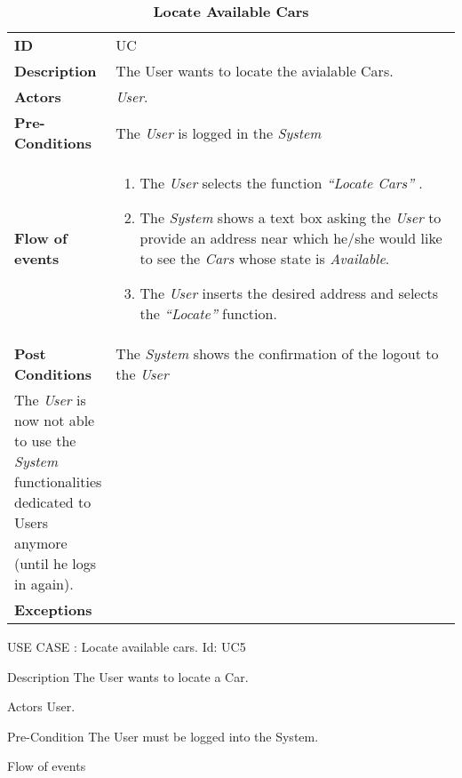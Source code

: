 \begin{longtable}{|p{0.2\linewidth} p{0.8\linewidth}|}
	\captionsetup{labelformat=empty} %
	\caption{\textbf{Locate Available Cars}} %
	\label{UC_LocateCars}%
	\\ \hline %
	
	\textbf{ID} & UC\theUseCaseIdCounter \\ \hline
	\textbf{Description} & The User wants to locate the avialable Cars. \\ \hline
	\textbf{Actors} & \emph{User}.\\ \hline
	\textbf{Pre-Conditions} & The \emph{User} is logged in the \emph{System} \\ \hline
	\textbf{Flow of events} & 
	\begin{enumerate}
		\item The \emph{User} selects the function \textit{\textquotedblleft{Locate Cars}\textquotedblright} .
		\item The \emph{System} shows a text box asking the \emph{User} to provide an address near which he/she would like to see the \emph{Cars} whose state is \textit{Available}.
		\item The \emph{User} inserts the desired address and selects the \textit{\textquotedblleft{Locate}\textquotedblright} function.
	\end{enumerate}	 \\ \hline
	\textbf{Post Conditions} & The \emph{System} shows the confirmation of the logout to the \emph{User}\\ \hline
	The \emph{User} is now not able to use the \emph{System} functionalities dedicated to Users anymore (until he logs in again). \\ \hline
	\textbf{Exceptions} & 
\end{longtable}
USE CASE : Locate available cars.
Id:  UC5

Description
The User wants to locate a Car.

Actors
User.

Pre-Condition
The User must be logged into the System.

Flow of events

